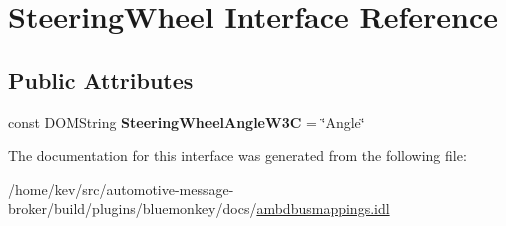 \hypertarget{interfaceSteeringWheel}{\section{Steering\+Wheel Interface Reference}
\label{interfaceSteeringWheel}
}
\subsection*{Public Attributes}
\begin{DoxyCompactItemize}
\item 
\hypertarget{interfaceSteeringWheel_ae97a606756309f61df6d5fa62fc60705}{const D\+O\+M\+String {\bfseries Steering\+Wheel\+Angle\+W3\+C} = \char`\"{}Angle\char`\"{}}\label{interfaceSteeringWheel_ae97a606756309f61df6d5fa62fc60705}

\end{DoxyCompactItemize}


The documentation for this interface was generated from the following file\+:\begin{DoxyCompactItemize}
\item 
/home/kev/src/automotive-\/message-\/broker/build/plugins/bluemonkey/docs/\hyperlink{ambdbusmappings_8idl}{ambdbusmappings.\+idl}\end{DoxyCompactItemize}
